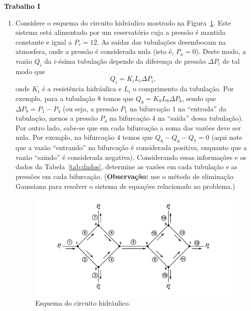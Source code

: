 \documentclass[12pt,a4paper]{article}
\begin{document}
\begin{center}
  \textbf{Trabalho I}
\end{center}

\begin{enumerate}
  
  \item Considere o esquema do circuito hidráulico mostrado na Figura~\ref{fig:tub}.
  Este sistema está alimentado por um reservatório cuja a pressão é mantida constante
  e igual a $P_r = 12$. As saídas das tubulações desembocam na atmosfera, onde a
  pressão é considerada nula (isto é, $P_a = 0$). Deste modo, a vazão $Q_i$ da
  $i$-ésima tubulação depende da diferença de pressão $\Delta P_i$ de tal modo que
  $$Q_i = K_iL_i\Delta P_i,$$ onde $K_i$ é a resistência hidráulica e $L_i$ o
  comprimento da tubulação. Por exemplo, para a tubulação $8$ temos que
  $Q_8 = K_8L_8\Delta P_8$, sendo que $\Delta P_8 = P_1 - P_4$ (ou seja,
  a pressão $P_1$ na bifurcação $1$ na ``entrada'' da tubulação, menos a
  pressão $P_4$ na bifurcação $4$ na ``saída'' dessa tubulação).
  Por outro lado, sabe-se que em cada bifurcação a soma das vazões 
  deve ser nula. Por exemplo, na bifurcação $4$ temos que $Q_8 - Q_6 - Q_7 = 0$
  (aqui note que a vazão ``entrando'' na bifurcação é considerada positiva,
  enquanto que a vazão ``saindo'' é considerada negativa). Considerando essas
  informações e os dados da Tabela~\ref{tab:dados}, determine as vazões em
  cada tubulação e as pressões em cada bifurcação. (\textbf{Observação:} use
  o método de eliminação Gaussiana para resolver o sistema de equações
  relacionado ao problema.)

  \begin{figure}[H]
    \centering
    \includegraphics[scale=0.75]{imagem/tubulacao-circuito-hidraulico.pdf}
    \caption{Esquema do circuito hidráulico.}
    \label{fig:tub}
  \end{figure}


\end{enumerate}
\end{document}
